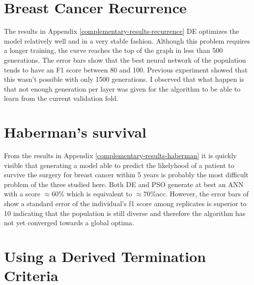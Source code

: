 \documentclass[a4paper,12pt, oneside]{memoir}
\begin{document}
\clearpage

\section{Breast Cancer Recurrence}

The results in Appendix \ref{complementary-results-recurrence} DE optimizes the model relatively well and in a very stable fashion. Although this problem requires a longer training, the curve reaches the top of the graph in less than 500 generations. The error bars show that the best neural network of the population tends to have an F1 score between 80 and 100. Previous experiment showed that this wasn't possible with only 1500 generations. I observed that what happen is that not enough generation per layer was given for the algorithm to be able to learn from the current validation fold. 

\section{Haberman's survival}

From the results in Appendix \ref{complementary-results-haberman} it is quickly visible that generating a model able to predict the likelyhood of a patient to survive the surgery for breast cancer within 5 years is probably the most difficult problem of the three studied here. Both DE and PSO generate at best an ANN with a score $\approx60\%$ which is equivalent to $\approx70\%$acc. However, the error bars of show a standard error of the individual's f1 score among replicates is superior to 10 indicating that the population is still diverse and therefore the algorithm has not yet converged towards a global optima.
  
\section{Using a Derived Termination Criteria}
\end{document}
